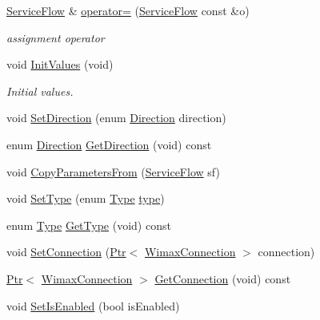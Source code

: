 \begin{DoxyCompactItemize}
\item 
\hyperlink{classns3_1_1ServiceFlow}{Service\+Flow} \& \hyperlink{classns3_1_1ServiceFlow_ae4ea282e5cbf4ac99598b1a7ee5badf9}{operator=} (\hyperlink{classns3_1_1ServiceFlow}{Service\+Flow} const \&o)
\begin{DoxyCompactList}\small\item\em assignment operator \end{DoxyCompactList}\item 
void \hyperlink{classns3_1_1ServiceFlow_ab0033129ef33dbf04faa2bc98c179f4f}{Init\+Values} (void)
\begin{DoxyCompactList}\small\item\em Initial values. \end{DoxyCompactList}\item 
void \hyperlink{classns3_1_1ServiceFlow_afcf66993c40e56d492e17b06589dd57a}{Set\+Direction} (enum \hyperlink{classns3_1_1ServiceFlow_ae14b8dc8bb371bad10fe078110655d4f}{Direction} direction)
\item 
enum \hyperlink{classns3_1_1ServiceFlow_ae14b8dc8bb371bad10fe078110655d4f}{Direction} \hyperlink{classns3_1_1ServiceFlow_a2e18e440a3d3b8a1a06ed8eea1aa8e0a}{Get\+Direction} (void) const 
\item 
void \hyperlink{classns3_1_1ServiceFlow_aae60e9fc7ea6b727946980e1ad376da7}{Copy\+Parameters\+From} (\hyperlink{classns3_1_1ServiceFlow}{Service\+Flow} sf)
\item 
void \hyperlink{classns3_1_1ServiceFlow_a48cafef2370995d59c2963339eeff61e}{Set\+Type} (enum \hyperlink{classns3_1_1ServiceFlow_a95a18bd8cae3a4eaa3568dad45ae941d}{Type} \hyperlink{visualizer-ideas_8txt_add98db9e15e2a58cf2b57623e7aa893a}{type})
\item 
enum \hyperlink{classns3_1_1ServiceFlow_a95a18bd8cae3a4eaa3568dad45ae941d}{Type} \hyperlink{classns3_1_1ServiceFlow_a60797fe4e802fc2e3ed0eebe04d3a44a}{Get\+Type} (void) const 
\item 
void \hyperlink{classns3_1_1ServiceFlow_af7ee28190978c72871a7227cc62807dc}{Set\+Connection} (\hyperlink{classns3_1_1Ptr}{Ptr}$<$ \hyperlink{classns3_1_1WimaxConnection}{Wimax\+Connection} $>$ connection)
\item 
\hyperlink{classns3_1_1Ptr}{Ptr}$<$ \hyperlink{classns3_1_1WimaxConnection}{Wimax\+Connection} $>$ \hyperlink{classns3_1_1ServiceFlow_a8e4684d79c49ae97a8a442fa4a372703}{Get\+Connection} (void) const 
\item 
void \hyperlink{classns3_1_1ServiceFlow_afaced536adaf84709f1a18993b425cad}{Set\+Is\+Enabled} (bool is\+Enabled)

\end{DoxyCompactItemize}
